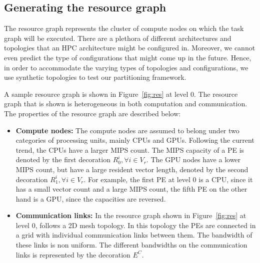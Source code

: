 \subsection{Generating the resource graph}
\label{sec:gener-reso-graph}

The resource graph represents the cluster of compute nodes on which the
task graph will be executed. There are a plethora of different
architectures and topologies that an HPC architecture might be
configured in. Moreover, we cannot even predict the type of
configurations that might come up in the future. Hence, in order to
accommodate the varying types of topologies and configurations, we use
synthetic topologies to test our partitioning framework.

A sample resource graph is shown in Figure~\ref{fig:res} at level 0. The
resource graph that is shown is heterogeneous in both computation and
communication. The properties of the resource graph are described below:

\begin{itemize}

\item \textbf{Compute nodes:} The compute nodes are assumed to belong
  under two categories of processing units, mainly CPUs and
  GPUs. Following the current trend, the CPUs have a larger MIPS
  count. The MIPS capacity of a PE is denoted by the first decoration
  $R^i_0, \forall i \in V_r$. The GPU nodes have a lower MIPS count, but
  have a large resident vector length, denoted by the second decoration
  $R^i_1, \forall i \in V_r$. For example, the first PE at level 0 is a
  CPU, since it has a small vector count and a large MIPS count, the
  fifth PE on the other hand is a GPU, since the capacities are
  reversed.



\item \textbf{Communication links:} In the resource graph shown in
  Figure~\ref{fig:res} at level 0, follows a 2D mesh topology. In this
  topology the PEs are connected in a grid with individual communication
  links between them. The bandwidth of these links is non
  uniform. The different bandwidths on the communication links is
  represented by the decoration $E^C$.

\end{itemize}

